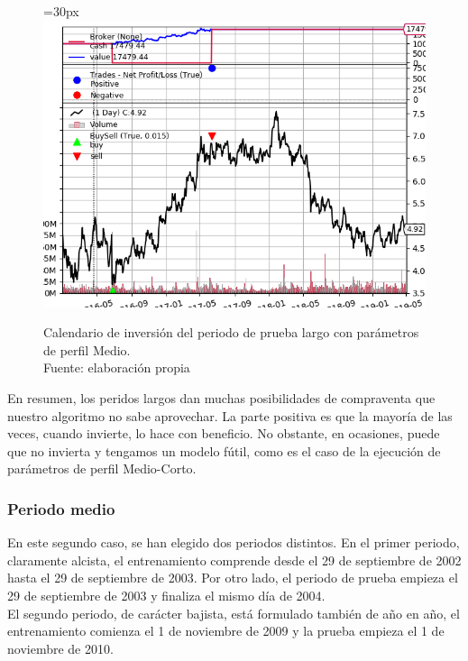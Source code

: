      	\begin{figure}[H]
     		\centering\leftskip=30px
     		\includegraphics[scale=0.75]{imagenes/L_Medium_test.png}
     		\caption[Calendario de inversi\'on del periodo de prueba largo]{Calendario de inversi\'on del periodo de prueba largo con par\'ametros de perfil Medio.\\ Fuente: elaboraci\'on propia}
     		\label{fig:large_period_mtest}
     	\end{figure}     	

En resumen, los peridos largos dan muchas posibilidades de compraventa que nuestro algoritmo no sabe aprovechar. La parte positiva es que la mayor\'ia de las veces, cuando invierte, lo hace con beneficio. No obstante, en ocasiones, puede que no invierta y tengamos un modelo f\'util, como es el caso de la ejecuci\'on de par\'ametros de perfil Medio-Corto.\\

\subsubsection{Periodo medio}

En este segundo caso, se han elegido dos periodos distintos. En el primer periodo, claramente alcista, el entrenamiento comprende desde el 29 de septiembre de 2002 hasta el 29 de septiembre de 2003. Por otro lado, el periodo de prueba empieza el 29 de septiembre de 2003 y finaliza el mismo d\'ia de 2004. \\

El segundo periodo, de car\'acter bajista, est\'a formulado tambi\'en de a\~no en a\~no, el entrenamiento comienza el 1 de noviembre de 2009 y la prueba empieza el 1 de noviembre de 2010.\\

